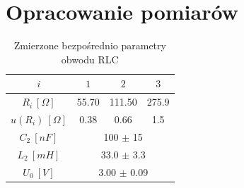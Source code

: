 \documentclass[12pt, a4paper, oneside]{article}
\begin{document}
\section{Opracowanie pomiarów}
\begin{table}[h!]
  \centering
  \caption{Zmierzone bezpośrednio parametry obwodu RLC}
    \begin{tabular}{|c|c|c|c|}\hline
    $i$ & $1$ & $2$ & $3$ \\\hline
    $R_i~[\Omega]$ & 55.70 & 111.50 & 275.9 \\\hline
    $u(R_i)~[\Omega]$ & 0.38 & 0.66 & 1.5 \\\hline
    $C_2~[nF]$ & \multicolumn{3}{|c|}{100 $\pm$ 15} \\\hline
    $L_2~[mH]$ & \multicolumn{3}{|c|}{33.0 $\pm$ 3.3} \\\hline
    $U_0~[V]$ & \multicolumn{3}{|c|}{3.00 $\pm$ 0.09} \\\hline
    \end{tabular}%
  \label{tab:addlabel}%
\end{table}%
\end{document}
